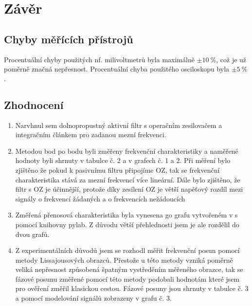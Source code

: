 \section*{Závěr}
  
  
  \subsection*{Chyby měřících přístrojů}
    \indent\indent
    Procentuální chyby použitých nf. milivoltmetrů byla maximálně $\pm10~\%$, což je už poměrně značná nepřesnost. Procentuální chyba použitého osciloskopu byla $\pm5~\%$.
  
  \subsection*{Zhodnocení}
    \begin{enumerate}
      \item
        Narvhnul sem dolnopropustný aktivní filtr s operačním zesilovačem a integračním článkem pro zadanou mezní frekvenci.
      \item
        Metodou bod po bodu byli změřeny frekvenční charakteristiky a naměřené hodnoty byli shrnuty v tabulce č. 2 a v grafech č. 1 a 2. Při měření bylo zjištěno že pokud k pasivnímu filtru připojíme OZ, tak se frekvenční charakteristika stává za mezní frekvencí více lineární. Dále bylo zjištěno, že filtr s OZ je účinnější, protože díky zesílení OZ je větší napěťový rozdíl mezi signály o frekvencí žádaných a o frekvencích nežádoucích
      \item
      	Změřená přenosová charakteristika byla vynesena go grafu vytvořeném v s pomocí knihovny pylab. Z důvodu větší přehlednosti jsem je ale rozdělil do dvou grafů.
      \item
        Z experimentálních důvodů jsem se rozhodl měřit frekvenční posun pomocí metody Lissajousových obrazců. Přestože u této metody vzniká poměrně veliká nepřesnost způsobená špatným vystředěním měřeného obrazce, tak se fázové posunu změřené pomocí této metody podobali hodnotám které jsem pro ověření změřil klasickou cestou. Fázové posuny jsou shrnuty v tabulce č. 3 a pomocí modelování signálů zobrazeny v grafu č. 3.
  \end{enumerate}

